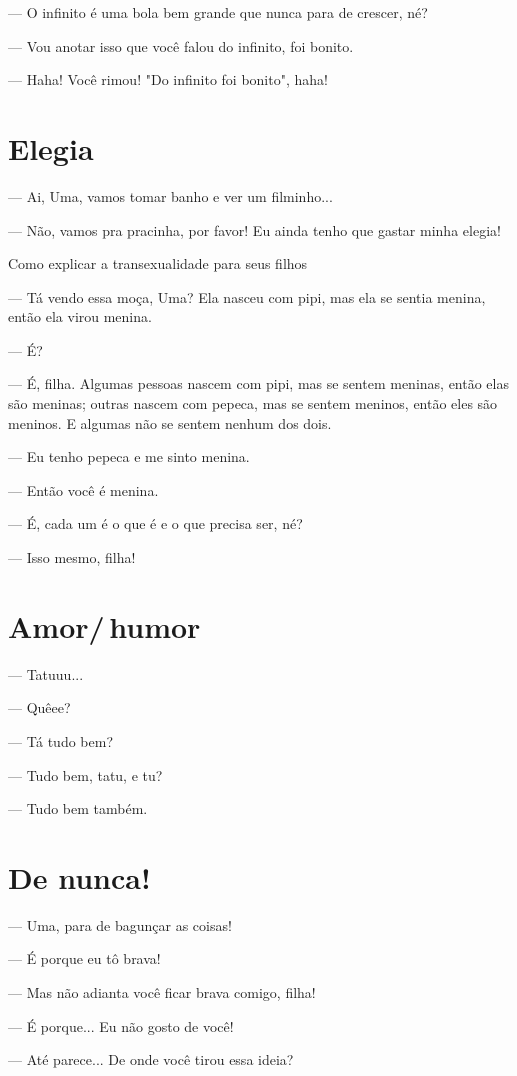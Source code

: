 {— O infinito é uma bola bem grande que nunca para de crescer, né?

— Vou anotar isso que você falou do infinito, foi bonito.

— Haha! Você rimou! "Do infinito foi bonito", haha!

\chapter{Elegia}

— Ai, Uma, vamos tomar banho e ver um filminho...

— Não, vamos pra pracinha, por favor! Eu ainda tenho que gastar minha
elegia!

Como explicar a transexualidade para seus filhos

— Tá vendo essa moça, Uma? Ela nasceu com pipi, mas ela se sentia
menina, então ela virou menina.

— É?

— É, filha. Algumas pessoas nascem com pipi, mas se sentem meninas,
então elas são meninas; outras nascem com pepeca, mas se sentem meninos,
então eles são meninos. E algumas não se sentem nenhum dos dois.

— Eu tenho pepeca e me sinto menina.

— Então você é menina.

— É, cada um é o que é e o que precisa ser, né?

— Isso mesmo, filha!

\chapter{Amor/\,humor}

— Tatuuu...

— Quêee?

— Tá tudo bem?

— Tudo bem, tatu, e tu?

— Tudo bem também.

\chapter{De nunca!}

— Uma, para de bagunçar as coisas!

— É porque eu tô brava!

— Mas não adianta você ficar brava comigo, filha!

— É porque... Eu não gosto de você!

— Até parece... De onde você tirou essa ideia?

}
